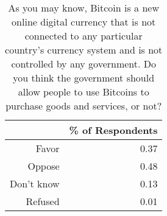 \begin{table}[ht]
\centering
\begin{tabular}{rr}
  \hline
 & \% of Respondents \\ 
  \hline
Favor & 0.37 \\ 
  Oppose & 0.48 \\ 
  Don't know & 0.13 \\ 
  Refused & 0.01 \\ 
   \hline
\end{tabular}
\caption{As you may know, Bitcoin is a new online digital currency that is not connected to any particular country's currency system and is not controlled by any government. Do you think the government should allow people to use Bitcoins to purchase goods and services, or not?} 
\end{table}
